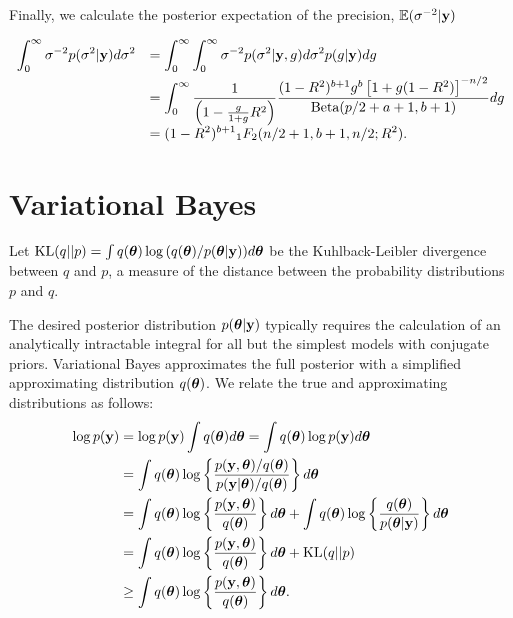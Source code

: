 \documentclass{amsart}[12pt]
\begin{document}
Finally, we calculate the posterior expectation of the precision, $\mathbb{E}(\sigma^{-2}|{\bf y})$

$$
\begin{array}{rl}
	\displaystyle \int_0^\infty \sigma^{-2} p(\sigma^2|{\bf y}) d\sigma^2 
	  & \displaystyle = \int_0^\infty \int_0^\infty \sigma^{-2} p(\sigma^2|{\bf y},g) d\sigma^2 p(g|{\bf y}) dg 
	\\ [2ex]
	  & \displaystyle =  \int_0^\infty \frac{1}{\left(                                                  
	1 -
	\tfrac{g}{1+g} R^2\right)} \frac{(1 -  R^2)^{b+1} g^{b} \left[  1 + g(1 -  R^2) \right]^{-n/2}}{\mbox{Beta}(p/2 + a + 1,b+1)} dg
	\\ [2ex]
	  & \displaystyle =  (1 -  R^2)^{b+1}                                                               
	{}_1 F_2(n/2+1,b+1,n/2;R^2)  .
\end{array}
$$

\section{Variational Bayes}
\label{sec:vb}

Let $\text{KL}(q||p) = \int q({\boldsymbol \theta}) \log{\left( q({\boldsymbol\theta})/p({\boldsymbol\theta}|{\bf y}) \right)} d {\boldsymbol \theta}$ be the
Kuhlback-Leibler divergence between $q$ and $p$, a measure of the distance between the probability
distributions $p$ and $q$.

The desired posterior distribution $p({\boldsymbol \theta} | {\bf y})$ typically requires the calculation of an analytically
intractable integral for all but the simplest models with conjugate priors. Variational Bayes approximates the
full posterior with a simplified approximating distribution $q({\boldsymbol \theta})$. We relate the true and
approximating distributions as follows:
\begin{align*}
	\log p({\bf y}) & = \log p({\bf y}) \int q({\boldsymbol \theta}) d {\boldsymbol \theta} = \int q({\boldsymbol \theta}) \log p({\bf y}) d {\boldsymbol \theta}                                    \\
	            & = \int q({\boldsymbol \theta}) \log \left\{ \frac{p({\bf y}, {\boldsymbol \theta}) / q({\boldsymbol \theta})}{p({\bf y}|{\boldsymbol \theta}) / q({\boldsymbol \theta})} \right\} d {\boldsymbol \theta} \\
	            & = \int q({\boldsymbol \theta}) \log\left\{ \frac{p({\bf y}, {\boldsymbol \theta})}{q({\boldsymbol \theta})} \right\} d {\boldsymbol \theta} +                              
	\int q({\boldsymbol \theta}) \log\left\{ \frac{q({\boldsymbol \theta})}{p({\boldsymbol \theta}|{\bf y})} \right\} d {\boldsymbol \theta} \\
	            & = \int q({\boldsymbol \theta}) \log\left\{ \frac{p({\bf y}, {\boldsymbol \theta})}{q({\boldsymbol \theta})} \right\} d {\boldsymbol \theta} +                              
	\text{KL}(q||p) \\
	            & \geq \int q({\boldsymbol \theta}) \log\left\{ \frac{p({\bf y}, {\boldsymbol \theta})}{q({\boldsymbol \theta})} \right\} d {\boldsymbol \theta}.                            
\end{align*}
\end{document}

